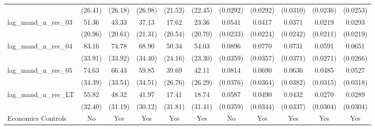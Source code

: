 {\begin{longtable}{l*{10}{c}}
                    &     (26.41)         &     (26.18)         &     (26.98)         &     (21.52)         &     (22.45)         &    (0.0292)         &    (0.0292)         &    (0.0310)         &    (0.0236)         &    (0.0253)         \\
[1em]
lag\_mand\_n\_rec\_03   &       51.36\sym{**} &       43.33\sym{**} &       37.13\sym{*}  &       17.62         &       23.36         &      0.0541\sym{**} &      0.0417\sym{*}  &      0.0371         &      0.0219         &      0.0293         \\
                    &     (20.96)         &     (20.61)         &     (21.31)         &     (20.54)         &     (20.70)         &    (0.0233)         &    (0.0224)         &    (0.0242)         &    (0.0211)         &    (0.0219)         \\
[1em]
lag\_mand\_n\_rec\_04   &       83.16\sym{**} &       74.78\sym{**} &       68.90\sym{*}  &       50.34\sym{**} &       54.03\sym{**} &      0.0896\sym{**} &      0.0770\sym{**} &      0.0731\sym{**} &      0.0591\sym{**} &      0.0651\sym{**} \\
                    &     (33.91)         &     (33.92)         &     (34.40)         &     (24.16)         &     (23.30)         &    (0.0359)         &    (0.0357)         &    (0.0371)         &    (0.0271)         &    (0.0266)         \\
[1em]
lag\_mand\_n\_rec\_05   &       74.63\sym{**} &       66.43\sym{*}  &       59.85\sym{*}  &       39.69         &       42.11         &      0.0814\sym{**} &      0.0690\sym{*}  &      0.0636\sym{*}  &      0.0485         &      0.0527\sym{*}  \\
                    &     (34.39)         &     (33.54)         &     (34.51)         &     (26.76)         &     (26.29)         &    (0.0376)         &    (0.0364)         &    (0.0382)         &    (0.0315)         &    (0.0318)         \\
[1em]
lag\_mand\_n\_rec\_LT   &       55.82\sym{*}  &       48.32         &       41.97         &       17.41         &       18.74         &      0.0587         &      0.0490         &      0.0432         &      0.0270         &      0.0289         \\
                    &     (32.40)         &     (31.19)         &     (30.12)         &     (31.81)         &     (31.41)         &    (0.0359)         &    (0.0344)         &    (0.0337)         &    (0.0304)         &    (0.0304)         \\
[1em]
Economics Controls  &          No         &         Yes         &         Yes         &         Yes         &         Yes         &          No         &         Yes         &         Yes         &         Yes         &         Yes         \\

\end{longtable}}

